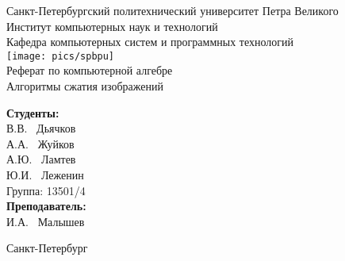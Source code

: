 \begin{titlepage}	%

	\begin{center}		%

		\large Санкт-Петербургский политехнический университет Петра Великого\\
		\large Институт компьютерных наук и технологий \\
		\large Кафедра компьютерных систем и программных технологий\\[1cm]
		
		\texttt{[image: pics/spbpu]}\\[2cm]
		
		\huge Реферат по компьютерной алгебре\\[0.5cm] %
		\huge Алгоритмы сжатия изображений\\[7cm]

	\end{center}	
	
	\begin{flushright} %
		\begin{minipage}{0.25\textwidth} %
			\begin{flushleft} %

				\large\textbf{Студенты:}\\
				\large В.В. ~Дьячков\\
				\large А.А. ~Жуйков\\
				\large А.Ю. ~Ламтев\\
				\large Ю.И. ~Леженин\\
				\large {Группа:} 13501/4\\
				
				\large \textbf{Преподаватель:}\\
				\large И.А. ~Малышев\\

			\end{flushleft}
		\end{minipage}
	\end{flushright}
	
	\vfill %

	\begin{center}
	\large Санкт-Петербург\\
	\large \the\year %
	\end{center} %
\thispagestyle{empty} %
\end{titlepage} %

\vfill %
